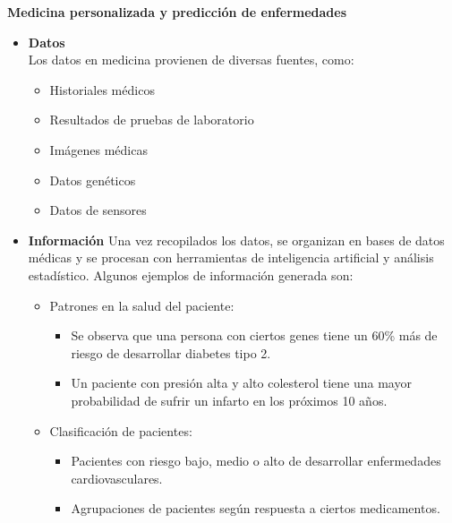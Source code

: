 \documentclass[12pt]{article}
\begin{document}
\textbf{Medicina personalizada y predicción de enfermedades}

\begin{itemize}
    \item \textbf{Datos}
    \\
    Los datos en medicina provienen de diversas fuentes, como:
    \begin{itemize}
        \item Historiales médicos
        \item Resultados de pruebas de laboratorio
        \item Imágenes médicas
        \item Datos genéticos
        \item Datos de sensores
    \end{itemize}

    \item \textbf{Información}
    Una vez recopilados los datos, se organizan en bases de datos médicas y se procesan con herramientas de inteligencia artificial 
    y análisis estadístico. Algunos ejemplos de información generada son:
    \begin{itemize}
        \item Patrones en la salud del paciente:
            \begin{itemize}
                \item Se observa que una persona con ciertos genes tiene un 60\% más de riesgo de desarrollar diabetes tipo 2.
                \item Un paciente con presión alta y alto colesterol tiene una mayor probabilidad de sufrir un infarto en los próximos 10 años.
            \end{itemize}
        \item Clasificación de pacientes:
            \begin{itemize}
                \item Pacientes con riesgo bajo, medio o alto de desarrollar enfermedades cardiovasculares.
                \item Agrupaciones de pacientes según respuesta a ciertos medicamentos.
            \end{itemize}
    \end{itemize}


\end{itemize}
\end{document}
